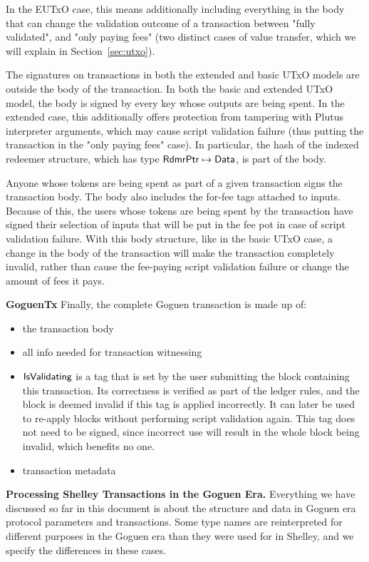 In the EUTxO case, this means additionally including everything in the body that can change
the validation outcome of a transaction between "fully validated", and "only
paying fees" (two distinct cases of value transfer, which
we will explain in Section~\ref{sec:utxo}).

The signatures on transactions in both the extended and basic UTxO models
are outside the body of the transaction.
In both the basic and extended UTxO model, the body is signed by every key
whose outputs are being spent. In the extended case, this additionally offers
protection from tampering with Plutus interpreter arguments, which may cause
script validation failure (thus putting the transaction in the "only paying fees" case).
In particular, the hash of the indexed redeemer structure, which has type
$\mathsf{RdmrPtr} \mapsto \mathsf{Data}$, is part of the body.

Anyone whose tokens are being spent as part of a given transaction
signs the transaction body. The body also includes the for-fee tags attached to inputs.
Because of this, the users whose tokens are being spent by the transaction have
signed their selection of
inputs that will be put in the fee pot in case of script validation failure.
With this body structure, like in the basic UTxO case, a change in the body of the transaction
will make the transaction completely invalid, rather than cause the fee-paying script validation
failure or change the amount of fees it pays.

\textbf{GoguenTx}
Finally, the complete Goguen transaction is made up of:

\begin{itemize}
  \item the transaction body
  \item all info needed for transaction witnessing
  \item $\mathsf{IsValidating}$ is a tag that is
  set by the user submitting the block containing this transaction.
  Its correctness is verified as part of the ledger rules, and the block is
  deemed invalid if this tag is applied incorrectly.
  It can later be used to re-apply blocks without performing script validation
  again. This tag does not need to be signed, since incorrect use will result
  in the whole block being invalid, which benefits no one.
  \item transaction metadata
\end{itemize}

\textbf{Processing Shelley Transactions in the Goguen Era.}
Everything we have discussed so far in this document is about the structure and data
in Goguen era protocol parameters and transactions. Some type names are reinterpreted
for different purposes in the Goguen era than they were used for in Shelley, and
we specify the differences in these cases.

